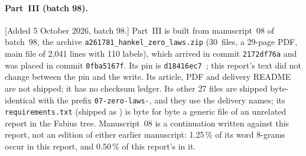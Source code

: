 \documentclass[11pt]{article}
\numberwithin{equation}{section}
\theoremstyle{definition}
\theoremstyle{remark}
\begin{document}
\paragraph{Part~III (batch 98).}
[Added 5 October 2026, batch 98.] Part~III is built from manuscript~08 of
batch~98, the archive \nolinkurl{a261781_hankel_zero_laws.zip} (30~files,
a 29-page PDF, main file of 2,041 lines with 110 labels), which arrived in
commit \texttt{2172df76a} and was placed in commit \texttt{0fba5167f}. Its
pin is \texttt{d18416ec7}~\cite{hzProveIt}; this report's text did not
change between the pin and the write. Its article, PDF and delivery README are not
shipped; it has no checksum ledger. Its other 27 files are shipped
byte-identical with the prefix \texttt{07-zero-laws-}, and they use the
delivery names; its \texttt{requirements.txt} (shipped as
) is byte for byte a generic file
of an unrelated report in the Fabius tree. Manuscript~08 is a continuation
written against this report, not an edition of either earlier manuscript:
1.25\,\% of its word 8-grams occur in this report, and 0.50\,\% of this
report's in it.
\end{document}

